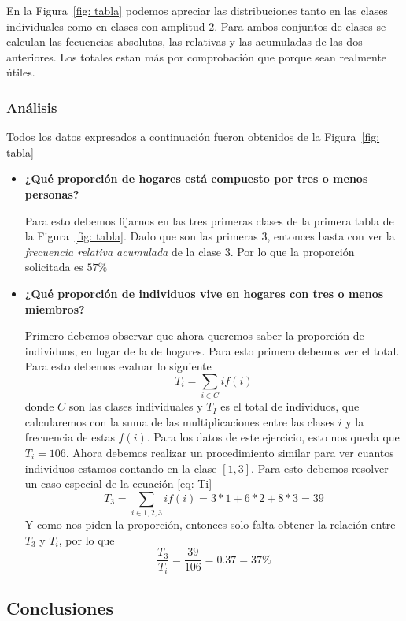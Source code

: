 \documentclass[12pt]{article}
\begin{document}
En la Figura~\ref{fig: tabla} podemos apreciar las distribuciones tanto en las clases individuales como en clases con amplitud $2$. Para ambos conjuntos de clases se calculan las fecuencias absolutas, las relativas y las acumuladas de las dos anteriores. Los totales estan m\'as por comprobaci\'on que porque sean realmente \'utiles.

\subsubsection*{An\'alisis}

\noindent Todos los datos expresados a continuaci\'on fueron obtenidos de la Figura~\ref{fig: tabla}

\begin{itemize}
	\item \textbf{¿Qué proporción de hogares está compuesto por tres o menos personas?} 
	
	Para esto debemos fijarnos en las tres primeras clases de la primera tabla de la Figura~\ref{fig: tabla}. Dado que son las primeras $3$, entonces basta con ver la \textit{frecuencia relativa acumulada} de la clase $3$. Por lo que la proporci\'on solicitada es $57\%$
	
	\item \textbf{¿Qué proporción de individuos vive en hogares con tres o menos miembros?}
	
	Primero debemos observar que ahora queremos saber la proporci\'on de individuos, en lugar de la de hogares. Para esto primero debemos ver el total. Para esto debemos evaluar lo siguiente
	\begin{equation} T_i = \sum_{i \in C}if(i) \label{eq: Ti}\end{equation}
	donde $C$ son las clases individuales y $T_I$ es el total de individuos, que calcularemos con la suma de las multiplicaciones entre las clases $i$ y la frecuencia de estas $f(i)$. Para los datos de este ejercicio, esto nos queda que $T_i = 106$.
	Ahora debemos realizar un procedimiento similar para ver cuantos individuos estamos contando en la clase $[1,3]$. Para esto debemos resolver un caso especial de la ecuaci\'on \ref{eq: Ti}
	$$ T_3 = \sum_{i \in {1,2,3}}if(i) = 3*1 + 6*2 + 8*3 = 39$$
	Y como nos piden la proporci\'on, entonces solo falta obtener la relaci\'on entre $T_3$ y $T_i$, por lo que
	$$ \frac{T_3}{T_i} = \frac{39}{106} = 0.37 = 37\%$$ 
\end{itemize}



\subsection*{Conclusiones}
\end{document}
